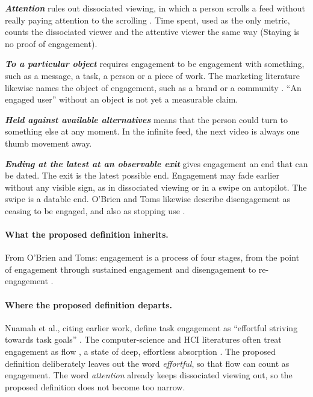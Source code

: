 \documentclass[12pt,a4paper]{report}
\begin{document}
\begin{center}
\end{center}

\textbf{\textit{Attention}} rules out dissociated viewing, in which a person scrolls a feed without really paying attention to the scrolling \cite{baughan_i_2022}. Time spent, used as the only metric, counts the dissociated viewer and the attentive viewer the same way (Staying is no proof of engagement).

\textbf{\textit{To a particular object}} requires engagement to be engagement with something, such as a message, a task, a person or a piece of work. The marketing literature likewise names the object of engagement, such as a brand or a community \cite{trunfio_conceptualising_2021}. ``An engaged user'' without an object is not yet a measurable claim.

\textbf{\textit{Held against available alternatives}} means that the person could turn to something else at any moment. In the infinite feed, the next video is always one thumb movement away.

\textbf{\textit{Ending at the latest at an observable exit}} gives engagement an end that can be dated. The exit is the latest possible end. Engagement may fade earlier without any visible sign, as in dissociated viewing or in a swipe on autopilot. The swipe is a datable end. O'Brien and Toms likewise describe disengagement as ceasing to be engaged, and also as stopping use \cite{obrien_what_2008}.

\paragraph{What the proposed definition inherits.} From O'Brien and Toms: engagement is a process of four stages, from the point of engagement through sustained engagement and disengagement to re-engagement \cite{obrien_what_2008}.

\paragraph{Where the proposed definition departs.} Nuamah et al., citing earlier work, define task engagement as ``effortful striving towards task goals'' \cite{nuamah_electroencephalography_2017}. The computer-science and HCI literatures often treat engagement as flow \cite{perski_conceptualising_2017}, a state of deep, effortless absorption \cite{knierim_flow_2026}. The proposed definition deliberately leaves out the word \emph{effortful}, so that flow can count as engagement. The word \emph{attention} already keeps dissociated viewing out, so the proposed definition does not become too narrow.
\end{document}
